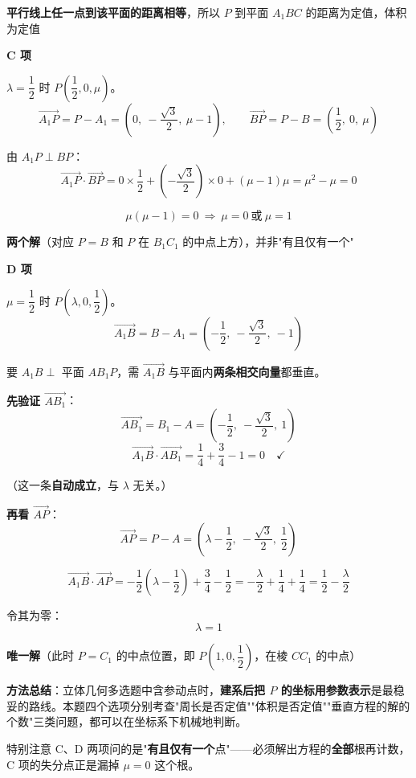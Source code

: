 \textbf{平行线上任一点到该平面的距离相等}，所以 $P$ 到平面 $A_1BC$ 的距离为定值，体积为定值 

\par\medskip

\textbf{C 项 }

$\lambda=\dfrac12$ 时 $P\left(\dfrac12,0,\mu\right)$。
\[\overrightarrow{A_1P}=P-A_1=\left(0,\ -\frac{\sqrt3}2,\ \mu-1\right),\qquad \overrightarrow{BP}=P-B=\left(\frac12,\ 0,\ \mu\right)\]

由 $A_1P\perp BP$：
\[\overrightarrow{A_1P}\cdot\overrightarrow{BP}=0\times\frac12+\left(-\frac{\sqrt3}2\right)\times0+(\mu-1)\mu=\mu^{2}-\mu=0\]

\[\mu(\mu-1)=0\ \Longrightarrow\ \mu=0\ \text{或}\ \mu=1\]

\textbf{两个解}（对应 $P=B$ 和 $P$ 在 $B_1C_1$ 的中点上方），并非"有且仅有一个" 

\par\medskip

\textbf{D 项 }

$\mu=\dfrac12$ 时 $P\left(\lambda,0,\dfrac12\right)$。
\[\overrightarrow{A_1B}=B-A_1=\left(-\frac12,\ -\frac{\sqrt3}2,\ -1\right)\]

要 $A_1B\perp$ 平面 $AB_1P$，需 $\overrightarrow{A_1B}$ 与平面内\textbf{两条相交向量}都垂直。

\textbf{先验证 $\overrightarrow{AB_1}$}：
\[\overrightarrow{AB_1}=B_1-A=\left(-\frac12,\ -\frac{\sqrt3}2,\ 1\right)\]
\[\overrightarrow{A_1B}\cdot\overrightarrow{AB_1}=\frac14+\frac34-1=0\quad\checkmark\]

（这一条\textbf{自动成立}，与 $\lambda$ 无关。）

\textbf{再看 $\overrightarrow{AP}$}：
\[\overrightarrow{AP}=P-A=\left(\lambda-\frac12,\ -\frac{\sqrt3}2,\ \frac12\right)\]

\[\overrightarrow{A_1B}\cdot\overrightarrow{AP}=-\frac12\left(\lambda-\frac12\right)+\frac34-\frac12=-\frac\lambda2+\frac14+\frac14=\frac12-\frac\lambda2\]

令其为零：
\[\lambda=1\]

\textbf{唯一解}（此时 $P=C_1$ 的中点位置，即 $P\left(1,0,\dfrac12\right)$，在棱 $CC_1$ 的中点）


\begin{gktip}
\textbf{方法总结}：立体几何多选题中含参动点时，\textbf{建系后把 $P$ 的坐标用参数表示}是最稳妥的路线。本题四个选项分别考查"周长是否定值""体积是否定值""垂直方程的解的个数"三类问题，都可以在坐标系下机械地判断。

特别注意 C、D 两项问的是"\textbf{有且仅有一个}点"——必须解出方程的\textbf{全部}根再计数，C 项的失分点正是漏掉 $\mu=0$ 这个根。
\end{gktip}

